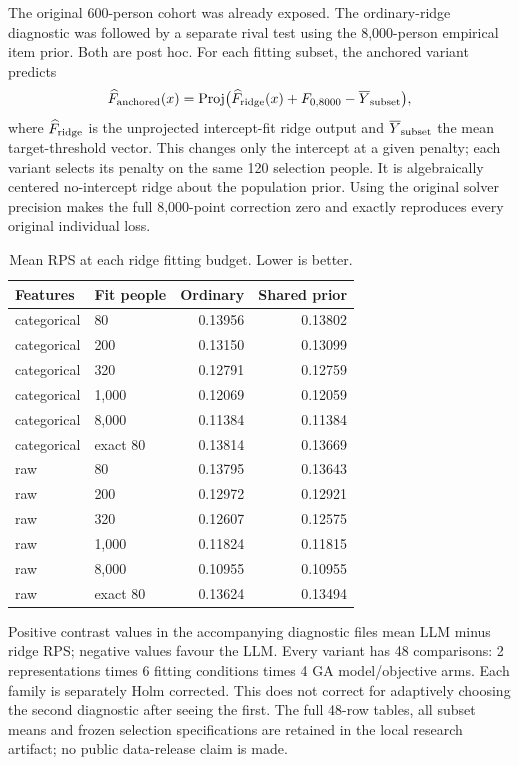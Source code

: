 \documentclass[10pt,twocolumn]{article}
\begin{document}
The original 600-person cohort was already exposed. The ordinary-ridge diagnostic
was followed by a separate rival test using the 8,000-person empirical item prior.
Both are post hoc. For each fitting subset, the anchored variant predicts
\begin{equation}
\widehat F_{\rm anchored}(x)=\operatorname{Proj}\bigl(\widehat F_{\rm ridge}(x)+F_{0,8000}-\overline Y_{\rm subset}\bigr),
\end{equation}
where $\widehat F_{\rm ridge}$ is the unprojected intercept-fit ridge output and
$\overline Y_{\rm subset}$ the mean target-threshold vector. This changes only the
intercept at a given penalty; each variant selects its penalty on the same 120
selection people. It is algebraically centered no-intercept ridge about the
population prior. Using the original solver precision makes the full 8,000-point
correction zero and exactly reproduces every original individual loss.

\begin{table}[H]\centering\small
\caption{Mean RPS at each ridge fitting budget. Lower is better.}\label{tab:budget}
\begin{tabular}{@{}llrr@{}}\toprule
Features & Fit people & Ordinary & Shared prior\\\midrule
categorical & 80 & 0.13956 & 0.13802\\
categorical & 200 & 0.13150 & 0.13099\\
categorical & 320 & 0.12791 & 0.12759\\
categorical & 1,000 & 0.12069 & 0.12059\\
categorical & 8,000 & 0.11384 & 0.11384\\
categorical & exact 80 & 0.13814 & 0.13669\\
raw & 80 & 0.13795 & 0.13643\\
raw & 200 & 0.12972 & 0.12921\\
raw & 320 & 0.12607 & 0.12575\\
raw & 1,000 & 0.11824 & 0.11815\\
raw & 8,000 & 0.10955 & 0.10955\\
raw & exact 80 & 0.13624 & 0.13494\\
\bottomrule\end{tabular}\end{table}

Positive contrast values in the accompanying diagnostic files mean LLM minus
ridge RPS; negative values favour the LLM. Every variant has 48 comparisons:
2 representations times 6 fitting conditions times 4 GA model/objective arms.
Each family is separately Holm corrected. This does not correct for adaptively
choosing the second diagnostic after seeing the first. The full 48-row tables,
all subset means and frozen selection specifications are retained in the local
research artifact; no public data-release claim is made.
\end{document}

